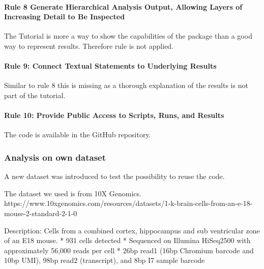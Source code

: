 \documentclass[a4paper, 10pt]{scrartcl}
\begin{document}
\hypertarget{rule-8-generate-hierarchical-analysis-output-allowing-layers-of-increasing-detail-to-be-inspected}{%
\paragraph{Rule 8 Generate Hierarchical Analysis Output, Allowing Layers
of Increasing Detail to Be
Inspected}\label{rule-8-generate-hierarchical-analysis-output-allowing-layers-of-increasing-detail-to-be-inspected}}

The Tutorial is more a way to show the capabilities of the package than
a good way to represent results. Therefore rule is not applied.

\hypertarget{rule-9-connect-textual-statements-to-underlying-results}{%
\paragraph{Rule 9: Connect Textual Statements to Underlying
Results}\label{rule-9-connect-textual-statements-to-underlying-results}}

Similar to rule 8 this is missing as a thorough explanation of the
results is not part of the tutorial.

\hypertarget{rule-10-provide-public-access-to-scripts-runs-and-results}{%
\paragraph{Rule 10: Provide Public Access to Scripts, Runs, and
Results}\label{rule-10-provide-public-access-to-scripts-runs-and-results}}

The code is available in the GitHub repository.

\hypertarget{analysis-on-own-dataset}{%
\subsubsection{Analysis on own dataset}\label{analysis-on-own-dataset}}

A new dataset was introduced to test the possibility to reuse the code.

The dataset we used is from 10X Genomics.
https://www.10xgenomics.com/resources/datasets/1-k-brain-cells-from-an-e-18-mouse-2-standard-2-1-0

Description: Cells from a combined cortex, hippocampus and sub
ventricular zone of an E18 mouse. * 931 cells detected * Sequenced on
Illumina HiSeq2500 with approximately 56,000 reads per cell * 26bp read1
(16bp Chromium barcode and 10bp UMI), 98bp read2 (transcript), and 8bp
I7 sample barcode
\end{document}
